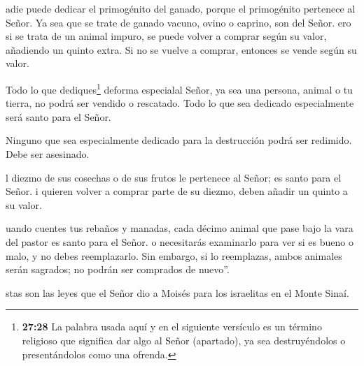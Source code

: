  adie puede dedicar el primogénito del ganado, porque el
primogénito pertenece al Señor. Ya sea que se trate de ganado vacuno,
ovino o caprino, son del Señor.  ero si se trata de un
animal impuro, se puede volver a comprar según su valor, añadiendo un
quinto extra. Si no se vuelve a comprar, entonces se vende según su
valor.

 Todo lo que dediques\footnote{\textbf{27:28} La palabra
  usada aquí y en el siguiente versículo es un término religioso que
  significa dar algo al Señor (apartado), ya sea destruyéndolos o
  presentándolos como una ofrenda.} deforma especialal Señor, ya sea una
persona, animal o tu tierra, no podrá ser vendido o rescatado. Todo lo
que sea dedicado especialmente será santo para el Señor.

 Ninguno que sea especialmente dedicado para la destrucción
podrá ser redimido. Debe ser asesinado.

 l diezmo de sus cosechas o de sus frutos le pertenece al
Señor; es santo para el Señor.  i quieren volver a comprar
parte de su diezmo, deben añadir un quinto a su valor.

 uando cuentes tus rebaños y manadas, cada décimo animal
que pase bajo la vara del pastor es santo para el Señor.  o
necesitarás examinarlo para ver si es bueno o malo, y no debes
reemplazarlo. Sin embargo, si lo reemplazas, ambos animales serán
sagrados; no podrán ser comprados de nuevo''.

 stas son las leyes que el Señor dio a Moisés para los
israelitas en el Monte Sinaí.

